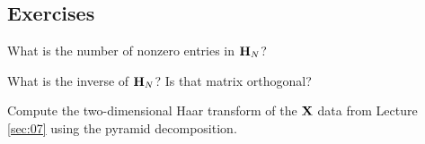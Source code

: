 \subsection{Exercises}

\begin{exercise}
What is the number of nonzero entries in ${\bf H}_N$?
\end{exercise}

\begin{exercise}
What is the inverse of ${\bf H}_N$? Is that matrix orthogonal?
\end{exercise}

\begin{exercise}
Compute the two-dimensional Haar transform of the ${\bf X}$ data from Lecture \ref{sec:07} using the pyramid decomposition.
\end{exercise}













